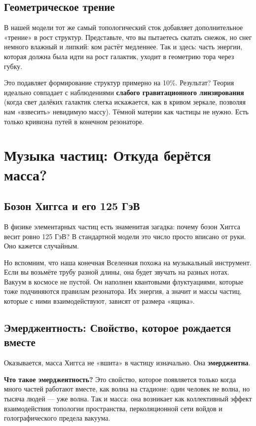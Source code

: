 \documentclass[12pt,a4paper,oneside]{book}
\begin{document}
\section{Геометрическое трение}

В нашей модели тот же самый топологический сток добавляет дополнительное «трение» в рост структур. Представьте, что вы пытаетесь скатать снежок, но снег немного влажный и липкий: ком растёт медленнее. Так и здесь: часть энергии, которая должна была идти на рост галактик, уходит в геометрию тора через губку.

Это подавляет формирование структур примерно на 10\%. Результат? Теория идеально совпадает с наблюдениями \textbf{слабого гравитационного линзирования} (когда свет далёких галактик слегка искажается, как в кривом зеркале, позволяя нам «взвесить» невидимую массу). Тёмной материи как частицы не нужно. Есть только кривизна путей в конечном резонаторе.

\chapter{Музыка частиц: Откуда берётся масса?}

\section{Бозон Хиггса и его 125 ГэВ}

В физике элементарных частиц есть знаменитая загадка: почему бозон Хиггса весит ровно 125 ГэВ? В стандартной модели это число просто вписано от руки. Оно кажется случайным.

Но вспомним, что наша конечная Вселенная похожа на музыкальный инструмент. Если вы возьмёте трубу разной длины, она будет звучать на разных нотах. Вакуум в космосе не пустой. Он наполнен квантовыми флуктуациями, которые тоже подчиняются правилам резонатора. Их энергия, а значит и массы частиц, которые с ними взаимодействуют, зависят от размера «ящика».

\section{Эмерджентность: Свойство, которое рождается вместе}

Оказывается, масса Хиггса не «вшита» в частицу изначально. Она \textbf{эмерджентна}.

\textbf{Что такое эмерджентность?} Это свойство, которое появляется только когда много частей работают вместе, как волна на стадионе: один человек не волна, но тысяча людей — уже волна. Так и масса: она возникает как коллективный эффект взаимодействия топологии пространства, перколяционной сети войдов и голографического предела вакуума.
\end{document}
